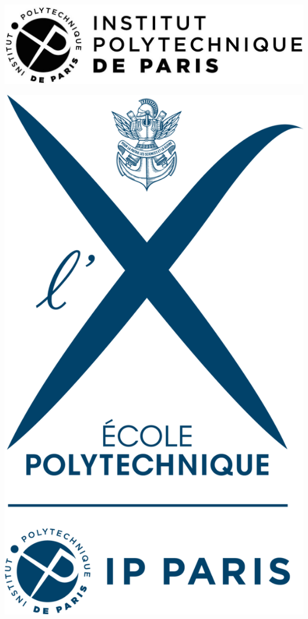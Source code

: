 \documentclass[a4paper,openright,twoside,12pt]{book}
\date{}
\numberwithin{equation}{section}
\begin{document}
\pagestyle{empty}
%
\begin{center}
\begin{minipage}{0.45\textwidth}
\includegraphics[width=1\textwidth]{ipp.jpg}
\end{minipage}
\hfill
\begin{minipage}{0.2\textwidth}
\includegraphics[width=1\textwidth]{polytechnique.png}

\end{minipage}
\end{center}
\end{document}

